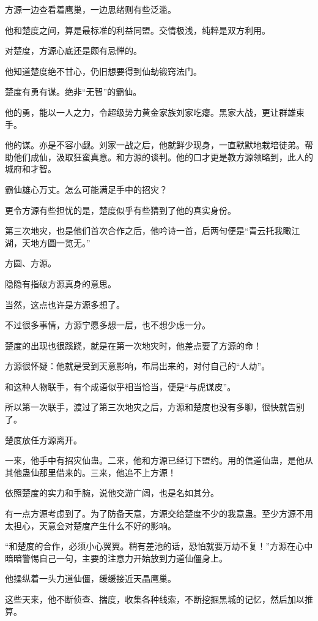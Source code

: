 \begin{this_body}
方源一边查看着鹰巢，一边思绪则有些泛滥。

他和楚度之间，算是最标准的利益同盟。交情极浅，纯粹是双方利用。

对楚度，方源心底还是颇有忌惮的。

他知道楚度绝不甘心，仍旧想要得到仙劫锻窍法门。

楚度有勇有谋。绝非“无智”的霸仙。

他的勇，能以一人之力，令超级势力黄金家族刘家吃瘪。黑家大战，更让群雄束手。

他的谋。亦是不容小觑。刘家一战之后，他就鲜少现身，一直默默地栽培徒弟。帮助他们成仙，汲取狂蛮真意。和方源的谈判。他的口才更是教方源领略到，此人的城府和才智。

霸仙雄心万丈。怎么可能满足手中的招灾？

更令方源有些担忧的是，楚度似乎有些猜到了他的真实身份。

第三次地灾，也是他们首次合作之后，他吟诗一首，后两句便是“青云托我瞰江湖，天地方圆一览无。”

方圆、方源。

隐隐有指破方源真身的意思。

当然，这点也许是方源多想了。

不过很多事情，方源宁愿多想一层，也不想少虑一分。

楚度的出现也很蹊跷，就是在第一次地灾时，他差点要了方源的命！

方源很怀疑：他就是受到天意影响，布局出来的，对付自己的“人劫”。

和这种人物联手，有个成语似乎相当恰当，便是“与虎谋皮”。

所以第一次联手，渡过了第三次地灾之后，方源和楚度也没有多聊，很快就告别了。

楚度放任方源离开。

一来，他手中有招灾仙蛊。二来，他和方源已经订下盟约。用的信道仙蛊，是他从其他蛊仙那里借来的。三来，他追不上方源！

依照楚度的实力和手腕，说他交游广阔，也是名如其分。

有一点方源考虑到了。为了防备天意，方源交给楚度不少的我意蛊。至少方源不用太担心，天意会对楚度产生什么不好的影响。

“和楚度的合作，必须小心翼翼。稍有差池的话，恐怕就要万劫不复！”方源在心中暗暗警惕自己一句，主要的注意力开始放到力道仙僵身上。

他操纵着一头力道仙僵，缓缓接近天晶鹰巢。

这些天来，他不断侦查、揣度，收集各种线索，不断挖掘黑城的记忆，然后加以推算。


\end{this_body}
